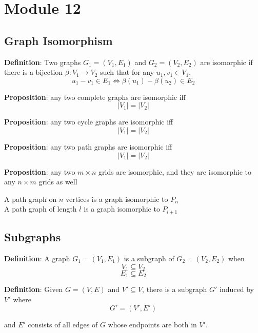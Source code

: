 \chapter{Module 12}

\section{Graph Isomorphism}

\begin{framed}
   \textbf{Definition}: Two graphs $G_1 = (V_1, E_1)$  and $G_2 = (V_2, E_2)$ are isomorphic if there is a bijection $\beta :V_1 \rightarrow V_2$ such that for any $u_1, v_1 \in V_1$, 
   \[
     u_1 -v_1 \in E_1 \iff \beta(u_1) - \beta(u_2) \in E_2
   \] 
\end{framed}

\begin{framed}
   \textbf{Proposition}: any two complete graphs are isomorphic iff
   \[
     |V_1| = |V_2| 
   \]

   \textbf{Proposition}: any two cycle graphs are isomorphic iff
   \[
     |V_1| = |V_2|
   \] 

   \textbf{Proposition}: any two path graphs are isomorphic iff
   \[
     |V_1| = |V_2|
   \] 

   \textbf{Proposition}: any two $m \times n$ grids are isomorphic, and they are isomorphic to any $n \times m$ grids as well
\end{framed}

\begin{framed}
   A path graph on $n$ vertices is a graph isomorphic to $P_n$ \\

   A path graph of length  $l$ is a graph isomorphic to $P_{l + 1}$
\end{framed}

\section{Subgraphs}
\begin{framed}
  \textbf{Definition}:  A graph $G_1 = (V_1, E_1)$ is a subgraph of $G_2 = (V_2, E_2)$ when
   \[
     V_1 \subseteq V_2 \] 
     \[
       E_1 \subseteq E_2
     \] 
\end{framed}

\begin{framed}
   \textbf{Definition}: Given $G = (V, E)$ and $V' \subseteq V$, there is a subgraph  $G'$ induced  by $V'$ where
       \[
        G' = (V', E')
      \] 

      and $E'$ consists of all edges of $G$ whose endpoints are both in $V'$. 
\end{framed}

